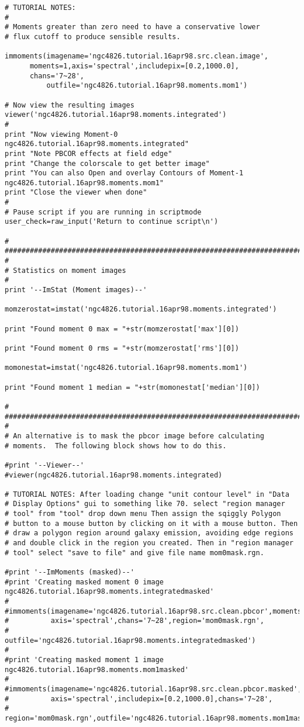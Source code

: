 \begin{verbatim}
# TUTORIAL NOTES:
#
# Moments greater than zero need to have a conservative lower
# flux cutoff to produce sensible results.

immoments(imagename='ngc4826.tutorial.16apr98.src.clean.image',
	  moments=1,axis='spectral',includepix=[0.2,1000.0],
	  chans='7~28',
          outfile='ngc4826.tutorial.16apr98.moments.mom1') 

# Now view the resulting images
viewer('ngc4826.tutorial.16apr98.moments.integrated')
#
print "Now viewing Moment-0 ngc4826.tutorial.16apr98.moments.integrated"
print "Note PBCOR effects at field edge"
print "Change the colorscale to get better image"
print "You can also Open and overlay Contours of Moment-1 ngc4826.tutorial.16apr98.moments.mom1"
print "Close the viewer when done"
#
# Pause script if you are running in scriptmode
user_check=raw_input('Return to continue script\n')

#
##########################################################################
#
# Statistics on moment images
#
print '--ImStat (Moment images)--'

momzerostat=imstat('ngc4826.tutorial.16apr98.moments.integrated')

print "Found moment 0 max = "+str(momzerostat['max'][0])

print "Found moment 0 rms = "+str(momzerostat['rms'][0])

momonestat=imstat('ngc4826.tutorial.16apr98.moments.mom1')

print "Found moment 1 median = "+str(momonestat['median'][0])

#
##########################################################################
#
# An alternative is to mask the pbcor image before calculating
# moments.  The following block shows how to do this.

#print '--Viewer--'
#viewer(ngc4826.tutorial.16apr98.moments.integrated)

# TUTORIAL NOTES: After loading change "unit contour level" in "Data
# Display Options" gui to something like 70. select "region manager
# tool" from "tool" drop down menu Then assign the sqiggly Polygon
# button to a mouse button by clicking on it with a mouse button. Then
# draw a polygon region around galaxy emission, avoiding edge regions
# and double click in the region you created. Then in "region manager
# tool" select "save to file" and give file name mom0mask.rgn.

#print '--ImMoments (masked)--'
#print 'Creating masked moment 0 image ngc4826.tutorial.16apr98.moments.integratedmasked'
#	
#immoments(imagename='ngc4826.tutorial.16apr98.src.clean.pbcor',moments=0,
#          axis='spectral',chans='7~28',region='mom0mask.rgn',
#          outfile='ngc4826.tutorial.16apr98.moments.integratedmasked') 
#
#print 'Creating masked moment 1 image ngc4826.tutorial.16apr98.moments.mom1masked'
#
#immoments(imagename='ngc4826.tutorial.16apr98.src.clean.pbcor.masked',moments=1,
#          axis='spectral',includepix=[0.2,1000.0],chans='7~28',
#          region='mom0mask.rgn',outfile='ngc4826.tutorial.16apr98.moments.mom1masked') 


\end{verbatim}
